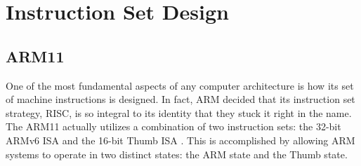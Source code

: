\documentclass[onecolumn, draftclsnofoot, 10pt, compsoc]{IEEEtran}
\begin{document}
\section{Instruction Set Design}
\subsection{ARM11}
One of the most fundamental aspects of any computer architecture is how its set of machine instructions is designed. In fact, ARM decided that its instruction set strategy, RISC, is so integral to its identity that they stuck it right in the name. The ARM11 actually utilizes a combination of two instruction sets: the 32-bit ARMv6 ISA and the 16-bit Thumb ISA \cite{armslides}. This is accomplished by allowing ARM systems to operate in two distinct states: the ARM state and the Thumb state. 
\end{document}
